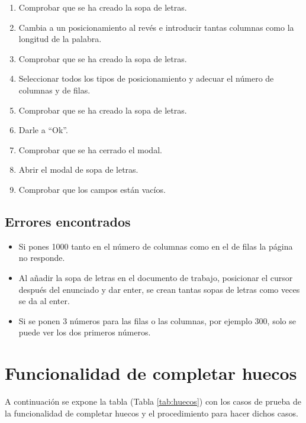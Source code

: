 \begin{enumerate}
    \item Comprobar que se ha creado la sopa de letras.
    \item Cambia a un posicionamiento al revés e introducir tantas columnas como la longitud de la palabra.
    \item Comprobar que se ha creado la sopa de letras.
    \item Seleccionar todos los tipos de posicionamiento y adecuar el número de columnas y de filas.
    \item Comprobar que se ha creado la sopa de letras.
    \item Darle a ``Ok''.
    \item Comprobar que se ha cerrado el modal.
    \item Abrir el modal de sopa de letras.
    \item Comprobar que los campos están vacíos.
\end{enumerate}

\subsection{Errores encontrados}
\label{errores:sopa}
\begin{itemize}
    \item Si pones 1000 tanto en el número de columnas como en el de filas la página no responde.
    \item Al añadir la sopa de letras en el documento de trabajo, posicionar el cursor después del enunciado y dar enter, se crean tantas sopas de letras como veces se da al enter.
    \item Si se ponen 3 números para las filas o las columnas, por ejemplo 300, solo se puede ver los dos primeros números.
\end{itemize}

\section{Funcionalidad de completar huecos}
\label{planPruebas:huecos}
A continuación se expone la tabla (Tabla \ref{tab:huecos}) con los casos de prueba de la funcionalidad de completar huecos y el procedimiento para hacer dichos casos.

